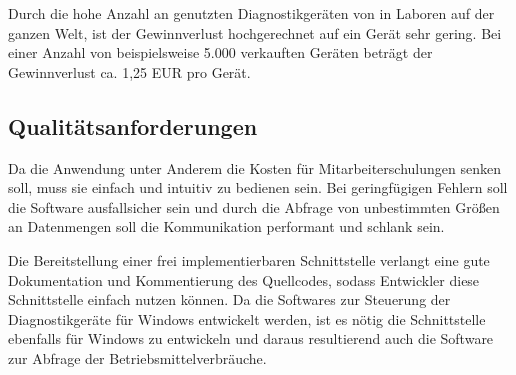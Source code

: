 Durch die hohe Anzahl an genutzten Diagnostikgeräten von {\betriebNameKzf} in Laboren auf der ganzen Welt, ist der Gewinnverlust hochgerechnet auf ein Gerät sehr gering. Bei einer Anzahl von beispielsweise 5.000 verkauften Geräten beträgt der Gewinnverlust ca. 1,25 EUR pro Gerät.

\subsection{Qualitätsanforderungen}
\label{sec:Qualitätsanforderungen}
Da die Anwendung unter Anderem die Kosten für Mitarbeiterschulungen senken soll, muss sie einfach und intuitiv zu bedienen sein. Bei geringfügigen Fehlern soll die Software ausfallsicher sein und durch die Abfrage von unbestimmten Größen an Datenmengen soll die Kommunikation performant und schlank sein.

Die Bereitstellung einer frei implementierbaren Schnittstelle verlangt eine gute Dokumentation und Kommentierung des Quellcodes, sodass Entwickler diese Schnittstelle einfach nutzen können. Da die Softwares zur Steuerung der Diagnostikgeräte für Windows entwickelt werden, ist es nötig die Schnittstelle ebenfalls für Windows zu entwickeln und daraus resultierend auch die Software zur Abfrage der Betriebsmittelverbräuche.